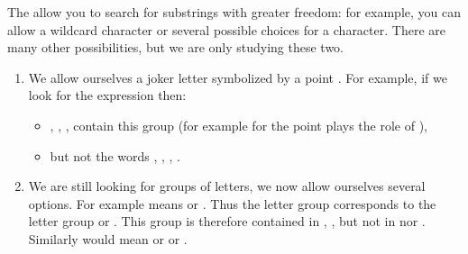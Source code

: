 \documentclass[11pt,class=report,crop=false]{standalone}
\begin{document}


\begin{cours}


The  allow you to search for substrings with greater freedom: for example, you can allow a wildcard character or several possible choices for a character.
There are many other possibilities, but we are only studying these two.

\begin{enumerate}
  \item We allow ourselves a joker letter symbolized by a point \og{}\fg{}. For example, if we look for the expression \og{}\fg{} then:

\begin{itemize}
  \item {}, , ,  contain this group (for example for  the point plays the role of ),
  \item but not the words , , , . 
\end{itemize}

  \item We are still looking for groups of letters, we now allow ourselves several options. For example \og\mot{[CT]}\fg{} means \og{} or \fg{}. Thus the letter group \og{}\fg{} corresponds to the letter group \og{}\fg{} or \og{}\fg{}. This group is therefore contained in , ,  but not in  nor . Similarly \og\mot{[ABC]}\fg{} would mean \og{} or  or \fg{}.

\end{enumerate}


\end{cours}
\end{document}
